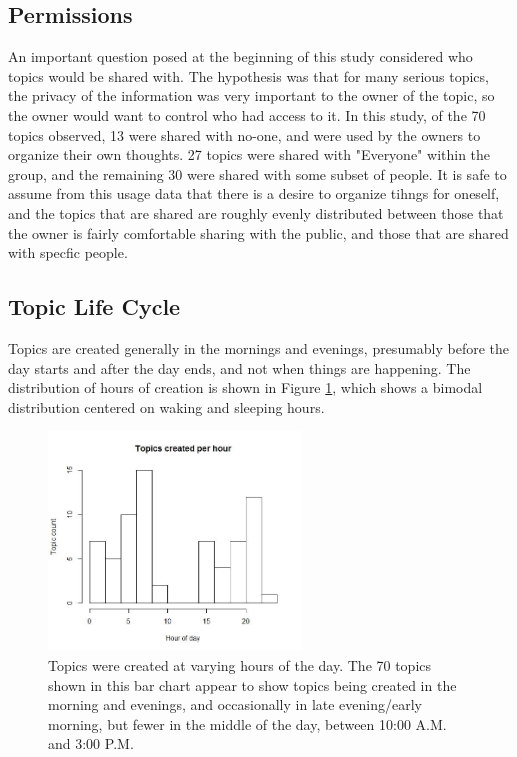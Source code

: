     \subsection{Permissions}
    An important question posed at the beginning of this study
    considered who topics would be shared with.
    The hypothesis was that for many serious topics,
    the privacy of the information was very important to the owner of the topic,
    so the owner would want to control who had access to it.
    In this study, of the 70 topics observed, 13 were shared with no-one,
    and were used by the owners to organize their own thoughts.
    27 topics were shared with "Everyone" within the group,
    and the remaining 30 were shared with some subset of people.
    It is safe to assume from this usage data that
    there is a desire to organize tihngs for oneself,
    and the topics that are shared are roughly evenly distributed
    between those that the owner is fairly comfortable sharing with the public,
    and those that are shared with specfic people.

    \subsection{Topic Life Cycle}
    Topics are created generally in the mornings and evenings,
    presumably before the day starts and after the day ends,
    and not when things are happening.
    The distribution of hours of creation is shown in
    Figure \ref{fig:topic_hours},
    which shows a bimodal distribution centered on waking and sleeping hours.

    \begin{figure}
    \centering
    \includegraphics[width=0.6\textwidth]{topics_per_hour.jpg}
    \caption[Topics Created by Hour of Day]{
      Topics were created at varying hours of the day.
      The 70 topics shown in this bar chart appear to show
      topics being created in the morning and evenings,
      and occasionally in late evening/early morning,
      but fewer in the middle of the day, between 10:00 A.M. and 3:00 P.M.
    }
    \label{fig:topic_hours}
    \end{figure}

